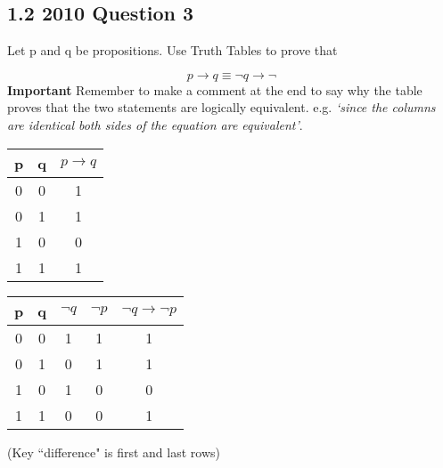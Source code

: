 \newpage

\subsection*{1.2 2010 Question 3}

Let p and q be propositions. Use Truth Tables to prove that

\[ p \rightarrow q \equiv \neg q \rightarrow \neg\]
\textbf{Important} Remember to make a comment at the end to say why the table proves that the two statements are logically equivalent. e.g. \emph{‘since the columns are identical both sides of the equation are equivalent’}.
{ 
\begin{tabular}{|c|c||c|}
\hline  p&  q& $p \rightarrow q$ \\ 
\hline  0&  0&  1\\ 
\hline  0&  1&  1\\ 
\hline  1&  0&  0\\ 
\hline  1&  1&  1\\ 
\hline 
\end{tabular} \hspace{0.5cm} \begin{tabular}{|c|c||c|c|c|}
\hline  p&  q& $\neg q$ & $\neg p$ & $\neg q \rightarrow \neg p$ \\ 
\hline  0&  0& 1& 1& 1\\ 
\hline  0&  1& 0& 1& 1\\ 
\hline  1&  0& 1& 0& 0\\ 
\hline  1&  1& 0& 0& 1\\ 
\hline 
\end{tabular}
} 
(Key ``difference" is first and last rows)



